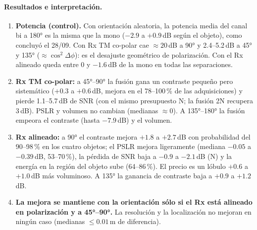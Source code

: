 \paragraph{Resultados e interpretación.}
\begin{enumerate}[itemsep=3pt]
  \item \textbf{Potencia (control).} Con orientación aleatoria, la potencia media del canal
  bi a 180° es la misma que la mono ($-2.9$ a $+0.9$\,dB según el objeto), como concluyó el
  28/09. Con Rx TM co-polar cae $\approx20$\,dB a 90° y 2.4--5.2\,dB a 45° y 135°
  ($\approx\cos^2\Delta\phi$): es el desajuste geométrico de polarización. Con el Rx alineado
  queda entre 0 y $-1.6$\,dB de la mono en todas las separaciones.
  \item \textbf{Rx TM co-polar:} a 45°--90° la fusión gana un contraste pequeño pero
  sistemático ($+0.3$ a $+0.6$\,dB, mejora en el 78--100\,\% de las adquisiciones) y pierde
  1.1--5.7\,dB de SNR (con el mismo presupuesto N; la fusión 2N recupera 3\,dB). PSLR y
  volumen no cambian (medianas $\approx0$). A 135°--180° la fusión empeora el contraste
  (hasta $-7.9$\,dB) y el volumen.
  \item \textbf{Rx alineado:} a 90° el contraste mejora $+1.8$ a $+2.7$\,dB con
  probabilidad del 90--98\,\% en los cuatro objetos; el PSLR mejora ligeramente
  (mediana $-0.05$ a $-0.39$\,dB, 53--70\,\%), la pérdida de SNR baja a $-0.9$ a
  $-2.1$\,dB (N) y la energía en la región del objeto sube (64--86\,\%). El precio es un
  lóbulo $+0.6$ a $+1.0$\,dB más voluminoso. A 135° la ganancia de contraste baja a
  $+0.9$ a $+1.2$\,dB.
  \item \textbf{La mejora se mantiene con la orientación sólo si el Rx está alineado
  en polarización y a 45°--90°.} La resolución y la localización no mejoran en ningún caso
  (medianas $\le0.01$\,m de diferencia).
\end{enumerate}

